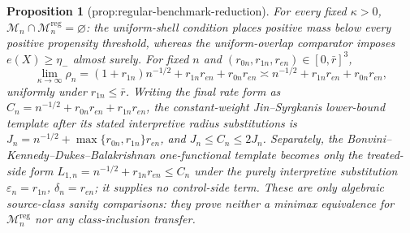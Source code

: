 \documentclass{article}
\newtheorem{proposition}{Proposition}
\begin{document}
\begin{proposition}[prop:regular-benchmark-reduction]\label{prop:regular-benchmark-reduction}
For every fixed \(\kappa>0\), \(\mathcal M_n\cap\mathcal M_n^{\mathrm{reg}}=\varnothing\): the uniform-shell condition places positive mass below every positive propensity threshold, whereas the uniform-overlap comparator imposes \(e(X)\ge\eta_-\) almost surely. For fixed \(n\) and \((r_{0n},r_{1n},r_{en})\in[0,\bar r]^3\),
\[
\lim_{\kappa\to\infty}\rho_n=(1+r_{1n})n^{-1/2}+r_{1n}r_{en}+r_{0n}r_{en}\asymp n^{-1/2}+r_{1n}r_{en}+r_{0n}r_{en},
\]
uniformly under \(r_{1n}\le\bar r\). Writing the final rate form as \(C_n=n^{-1/2}+r_{0n}r_{en}+r_{1n}r_{en}\), the constant-weight Jin--Syrgkanis lower-bound template after its stated interpretive radius substitutions is \(J_n=n^{-1/2}+\max\{r_{0n},r_{1n}\}r_{en}\), and \(J_n\le C_n\le2J_n\). Separately, the Bonvini--Kennedy--Dukes--Balakrishnan one-functional template becomes only the treated-side form \(L_{1,n}=n^{-1/2}+r_{1n}r_{en}\le C_n\) under the purely interpretive substitution \(\varepsilon_n=r_{1n}\), \(\delta_n=r_{en}\); it supplies no control-side term. These are only algebraic source-class sanity comparisons: they prove neither a minimax equivalence for \(\mathcal M_n^{\mathrm{reg}}\) nor any class-inclusion transfer.
\end{proposition}
\end{document}
